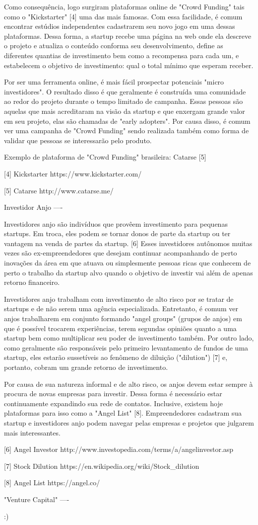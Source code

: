Como consequência, logo surgiram plataformas online de "Crowd Funding" tais como o "Kickstarter" [4] uma das mais famosas. Com essa facilidade, é comum encontrar estúdios independentes cadastrarem seu novo jogo em uma dessas plataformas. Dessa forma, a startup recebe uma página na web onde ela descreve o projeto e atualiza o conteúdo conforma seu desenvolvimento, define as diferentes quantias de investimento bem como a recompensa para cada um, e estabelecem o objetivo de investimento: qual o total mínimo que esperam receber.

Por ser uma ferramenta online, é mais fácil prospectar potenciais "micro investidores". O resultado disso é que geralmente é construída uma comunidade ao redor do projeto durante o tempo limitado de campanha. Essas pessoas são aquelas que mais acreditaram na visão da startup e que enxergam grande valor em seu projeto, elas são chamadas de "early adopters". Por causa disso, é comum ver uma campanha de "Crowd Funding" sendo realizada também como forma de validar que pessoas se interessarão pelo produto.

Exemplo de plataforma de "Crowd Funding" brasileira: Catarse [5]

[4] Kickstarter
https://www.kickstarter.com/

[5] Catarse
http://www.catarse.me/


Investidor Anjo
----

Investidores anjo são indivíduos que provêem investimento para pequenas startups. Em troca, eles podem se tornar donos de parte da startup ou ter vantagem na venda de partes da startup. [6] Esses investidores autônomos muitas vezes são ex-empreendedores que desejam continuar acompanhando de perto inovações da área em que atuava ou simplesmente pessoas ricas que conhecem de perto o trabalho da startup alvo quando o objetivo de investir vai além de apenas retorno financeiro.

Investidores anjo trabalham com investimento de alto risco por se tratar de startups e de não serem uma agência especializada. Entretanto, é comum ver anjos trabalharem em conjunto formando "angel groups" (grupos de anjos) em que é possível trocarem experiências, terem segundas opiniões quanto a uma startup bem como multiplicar seu poder de investimento também. Por outro lado, como geralmente são responsáveis pelo primeiro levantamento de fundos de uma startup, eles estarão sussetíveis ao fenômeno de diluição ("dilution") [7] e, portanto, cobram um grande retorno de investimento.

Por causa de sua natureza informal e de alto risco, os anjos devem estar sempre à procura de novas empresas para investir. Dessa forma é necessário estar continuamente expandindo sua rede de contatos. Inclusive, existem hoje plataformas para isso como a "Angel List" [8]. Empreendedores cadastram sua startup e investidores anjo podem navegar pelas empresas e projetos que julgarem mais interessantes.

[6] Angel Investor
http://www.investopedia.com/terms/a/angelinvestor.asp

[7] Stock Dilution
https://en.wikipedia.org/wiki/Stock_dilution

[8] Angel List
https://angel.co/


"Venture Capital"
----

:)
